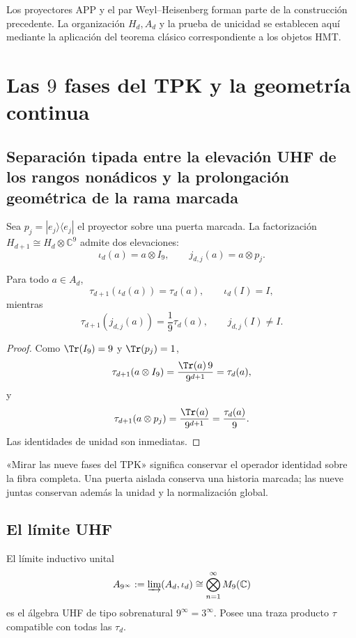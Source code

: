 \begin{sourcebox}
Los proyectores APP y el par Weyl--Heisenberg forman parte de la construcción
precedente. La organización \(H_d,A_d\) y la prueba de unicidad se establecen
aquí mediante la aplicación del teorema clásico correspondiente a los objetos
HMT.
\end{sourcebox}


\section{Las \(9\) fases del TPK y la geometría continua}

\subsection{Separación tipada entre la elevación UHF de los rangos nonádicos y la prolongación geométrica de la rama marcada}

Sea \(p_j=|e_j\rangle\langle e_j|\) el proyector sobre una puerta marcada.
La factorización \(H_{d+1}\cong H_d\otimes\mathbb C^9\) admite dos
elevaciones:
\[
  \iota_d(a)=a\otimes I_9,
  \qquad
  j_{d,j}(a)=a\otimes p_j.
\]

\begin{proposition}
Para todo \(a\in A_d\),
\[
  \tau_{d+1}(\iota_d(a))=\tau_d(a),
  \qquad
  \iota_d(I)=I,
\]
mientras
\[
  \tau_{d+1}(j_{d,j}(a))=\frac1{9}\tau_d(a),
  \qquad
  j_{d,j}(I)\ne I.
\]
\end{proposition}

\begin{proof}
Como \(\Tr(I_9)=9\) y \(\Tr(p_j)=1\),
\[
 \tau_{d+1}(a\otimes I_9)
 =\frac{\Tr(a)\,9}{9^{d+1}}
 =\tau_d(a),
\]
y
\[
 \tau_{d+1}(a\otimes p_j)
 =\frac{\Tr(a)}{9^{d+1}}
 =\frac{\tau_d(a)}9.
\]
Las identidades de unidad son inmediatas.
\end{proof}

\begin{intuitionbox}
«Mirar las nueve fases del TPK» significa conservar el operador identidad sobre la
fibra completa. Una puerta aislada conserva una historia marcada; las nueve
juntas conservan además la unidad y la normalización global.
\end{intuitionbox}

\subsection{El límite UHF}

\begin{theorem}
El límite inductivo unital
\[
  A_{9^\infty}
  :=
  \varinjlim(A_d,\iota_d)
  \cong
  \bigotimes_{n=1}^{\infty}M_9(\mathbb C)
\]
es el álgebra UHF de tipo sobrenatural \(9^\infty=3^\infty\). Posee una
traza producto \(\tau\) compatible con todas las \(\tau_d\).
\end{theorem}

